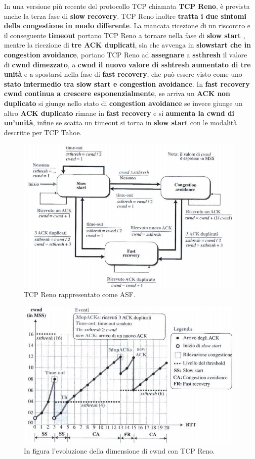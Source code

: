 \documentclass[11pt,a4paper]{article}
\theoremstyle{definition}
\begin{document}
\newpage
In una versione più recente del protocollo TCP chiamata \textbf{TCP Reno}, è prevista anche la terza fase di \textbf{slow recovery}. TCP Reno inoltre \textbf{tratta i due sintomi della congestione in modo differente}. La mancata ricezione di un riscontro e il conseguente \textbf{timeout} portano TCP Reno a tornare nella fase di \textbf{slow start }, mentre la ricezione di \textbf{tre ACK duplicati}, sia che avvenga in \textbf{slowstart che in congestion avoidance}, portano TCP Reno ad \textbf{assegnare} a \textbf{ssthresh} il valore di \textbf{cwnd dimezzato}, a \textbf{cwnd il nuovo valore di sshtresh aumentato di tre unità} e a spostarsi nella fase di \textbf{fast recovery}, che può essere visto come uno \textbf{stato intermedio tra slow start e congestion avoidance}. In \textbf{fast recovery cwnd continua a crescere esponenzialmente}, se arriva un \textbf{ACK non duplicato} si giunge nello stato di \textbf{congestion avoidance} se invece giunge un altro \textbf{ACK duplicato} rimane in \textbf{fast recovery} e si \textbf{aumenta la cwnd di un'unità}, infine se scatta un timeout si torna in \textbf{slow start} con le modalità descritte per TCP Tahoe.
\begin{figure}[!h]
	\includegraphics[scale=0.33]{Immagini/Reno.png}
	\centering
	\caption{TCP Reno rappresentato come ASF.}
\end{figure}
\begin{figure}[!h]
	\includegraphics[scale=0.31]{Immagini/Reno2.png}
	\centering
	\caption{In figura l'evoluzione della dimensione di cwnd con TCP Reno.}
\end{figure}
\end{document}
